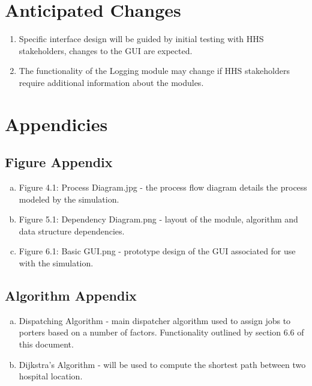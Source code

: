 \documentclass[paper=letter, fontsize=10pt]{scrartcl}
\numberwithin{equation}{section}		%
\numberwithin{figure}{section}			%
\numberwithin{table}{section}				%
\begin{document}
\section{Anticipated Changes}
\begin{enumerate}[1]
	\item Specific interface design will be guided by initial testing with HHS stakeholders, changes to the GUI are expected.
	 \item The functionality of the Logging module may change if HHS stakeholders require additional information about the modules.
\end{enumerate}

\section{Appendicies}
\subsection{Figure Appendix}
\begin{enumerate}[(a)]
	\item Figure 4.1: Process Diagram.jpg - the process flow diagram details the process modeled by the simulation.
	\item Figure 5.1: Dependency Diagram.png - layout of the module, algorithm and data structure dependencies.
	\item Figure 6.1: Basic GUI.png - prototype design of the GUI associated for use with the simulation.
\end{enumerate}
\subsection{Algorithm Appendix}
\begin{enumerate}[(a)]
	\item Dispatching Algorithm - main dispatcher algorithm used to assign jobs to porters based on a number of factors. Functionality outlined by section 6.6 of this document.
	\item Dijkstra's Algorithm - will be used to compute the shortest path between two hospital location.
\end{enumerate}

\end{document}
